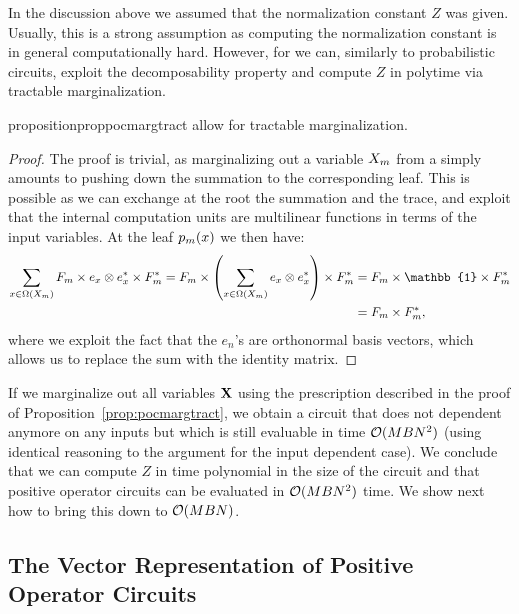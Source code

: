 In the discussion above we assumed that the normalization constant $Z$ was given. Usually, this is a strong assumption as computing the normalization constant is in general computationally hard. However, for \pocs we can, similarly to probabilistic circuits, exploit the decomposability property and compute $Z$ in polytime via tractable marginalization.


\begin{restatable}{proposition}{proppocmargtract}
	\label{prop:pocmargtract}
	\pocs allow for tractable marginalization.
\end{restatable}

\begin{proof}
	The proof is trivial, as marginalizing out a variable $X_m$ from a \poc simply amounts to pushing down the summation to the corresponding leaf. This is possible as we can exchange at the root the summation and the trace, and exploit that the internal computation units are multilinear functions in terms of the input variables. At the leaf $p_m (x)$ we then have:
	\begin{align}
		\sum_{\xvar\in \Omega(\Xvar_m)} F_{m} \times  e_{\xvar} \otimes  e^*_{\xvar} \times F_{m}^*
		=
		F_{m} \times  \left( \sum_{\xvar\in \Omega(\Xvar_m)}  e_{\xvar} \otimes  e^*_{\xvar} \right) \times F_{m}^*
		 &
		=
		F_{m} \times  \mathbb{1} \times F_{m}^*
		\nonumber
		\\
		 &
		=
		F_{m} \times  F_{m}^*,
	\end{align}
	where we exploit the fact that the $e_n$'s are orthonormal basis vectors, which allows us to replace the sum with the identity matrix.
\end{proof}

If we marginalize out all variables $\mathbf{X}$ using the prescription described in the proof of Proposition~\ref{prop:pocmargtract}, we obtain a circuit that does not dependent anymore on any inputs but which is still evaluable in time $\mathcal{O} (MBN^2)$ (using identical reasoning to the argument for the input dependent case).
We conclude that we can compute $Z$ in time polynomial in the size of the circuit and that positive operator circuits can be evaluated in $\mathcal{O} (MBN^2)$ time. We show next how to bring this down to $\mathcal{O} (MBN)$.







\subsection{The Vector Representation of Positive Operator Circuits}
\label{sec:vpoc}


